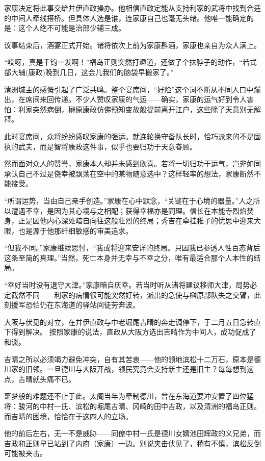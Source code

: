 \documentclass[
]{article}
\begin{document}
家康决定将此事交给井伊直政操办。他相信直政定能从支持利家的武将中找到合适的中间人牵线搭桥。但具体人选是谁，连家康自己也毫无头绪。他唯一能确定的是：这个人绝不可能是治部少辅三成。

议事结束后，酒宴正式开始。诸将依次上前为家康斟酒，家康也亲自为众人满上。

``哎呀，真是千钧一发啊！''福岛正则突然打趣道，还做了个抹脖子的动作，``若式部大辅(康政)晚到几日，这会儿我们的脑袋早搬家了。''

清洲城主的感慨引起了广泛共鸣。整个宴席间，``好险''这个词不断从不同人口中蹦出，在席间来回传递。不少人赞叹家康的气运------确实，家康的运气好到令人害怕：利家突然病倒，榊原康政仿佛预知变故般提前离开江户，这些除了天意别无解释。

此时宴席间，众将纷纷感叹家康的强运。就连轮换守备队长时，恰巧派来的不是固执的武夫，而是智将康政这件事，似乎也要归功于天意眷顾。

然而面对众人的赞誉，家康本人却并未感到欣喜。若将一切归功于运气，岂非如同承认自己不过是侥幸被飘荡在空中的某物随意选中？这样轻率的想法，家康断然不能接受。

``所谓运势，当由自己亲手创造。''家康在心中默念，``关键在于心境的器量。''人之所以遭遇不幸，是因为其心境与之相配；获得幸福亦是同理。信长在本能寺烈焰焚身，正是因他内心深处暗自向往这般壮烈的终局；秀吉在牵挂稚子的忧思中迎来大限，也是源于他那纤细敏感的审美追求。

``但我不同。''家康继续思忖，``我或将迎来安详的终局。只因我已参透人性百态背后这条至简的真理。''当然，死亡本身并无幸与不幸之分，唯有最适合那个人本性的结局。

``幸好当时没有退守大津。''家康暗自庆幸。若当时听从诸将建议移师大津，局势必定截然不同------利家的病情很可能突然好转，派出的急使与榊原部队失之交臂，此刻援军恐怕仍在东海道的驿站间徒劳奔波。

大阪与伏见的对立，在井伊直政与中老堀尾吉晴的奔走调停下，于二月五日急转直下得到解决。 按照家康的说法，直政从大阪方选出吉晴作为中间人，成功促成了和谈。

吉晴之所以必须竭力避免冲突，自有其苦衷------他的领地滨松十二万石，原本是德川家的旧领。一旦德川与大阪开战，领民究竟会支持新主还是旧主？每每想到这点，吉晴就头痛不已。

噩梦般的难题还不止于此。太阁当年为牵制德川，曾在东海道要冲安置了四位猛将：骏河的中村一氏、滨松的堀尾吉晴、冈崎的田中吉政，以及清洲的福岛正则。而吉晴的困境，恰恰在于这四人的立场。

他的前后左右，无一不是威胁------同僚中村一氏是德川女婿池田辉政的义兄弟，而吉政和正则早已站到了内府（家康）一边。别说夹击伏见了，稍有不慎，滨松反倒可能被夹击。
\end{document}
